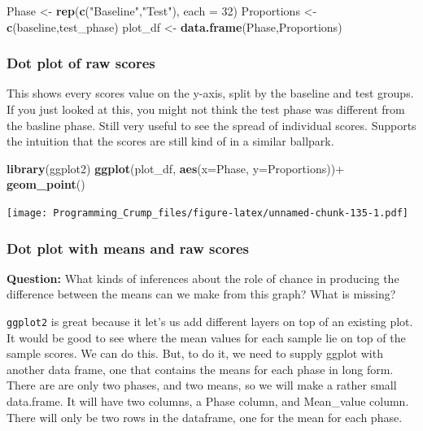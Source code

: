 \documentclass[]{book}
\newenvironment{Shaded}{\begin{snugshade}}{\end{snugshade}}
\newcommand{\KeywordTok}[1]{\textcolor[rgb]{0.13,0.29,0.53}{\textbf{{#1}}}}
\newcommand{\DataTypeTok}[1]{\textcolor[rgb]{0.13,0.29,0.53}{{#1}}}
\newcommand{\DecValTok}[1]{\textcolor[rgb]{0.00,0.00,0.81}{{#1}}}
\newcommand{\StringTok}[1]{\textcolor[rgb]{0.31,0.60,0.02}{{#1}}}
\newcommand{\NormalTok}[1]{{#1}}
\theoremstyle{definition}
\theoremstyle{definition}
\theoremstyle{definition}
\theoremstyle{remark}
\begin{document}
\begin{Shaded}
\begin{Highlighting}[]
\NormalTok{Phase <-}\StringTok{ }\KeywordTok{rep}\NormalTok{(}\KeywordTok{c}\NormalTok{(}\StringTok{"Baseline"}\NormalTok{,}\StringTok{"Test"}\NormalTok{), }\DataTypeTok{each =} \DecValTok{32}\NormalTok{)}
\NormalTok{Proportions <-}\StringTok{ }\KeywordTok{c}\NormalTok{(baseline,test_phase)}
\NormalTok{plot_df <-}\StringTok{ }\KeywordTok{data.frame}\NormalTok{(Phase,Proportions)}
\end{Highlighting}
\end{Shaded}

\subsubsection{Dot plot of raw scores}\label{dot-plot-of-raw-scores}

This shows every scores value on the y-axis, split by the baseline and
test groups. If you just looked at this, you might not think the test
phase was different from the basline phase. Still very useful to see the
spread of individual scores. Supports the intuition that the scores are
still kind of in a similar ballpark.

\begin{Shaded}
\begin{Highlighting}[]
\KeywordTok{library}\NormalTok{(ggplot2)}
\KeywordTok{ggplot}\NormalTok{(plot_df, }\KeywordTok{aes}\NormalTok{(}\DataTypeTok{x=}\NormalTok{Phase, }\DataTypeTok{y=}\NormalTok{Proportions))+}
\StringTok{  }\KeywordTok{geom_point}\NormalTok{()}
\end{Highlighting}
\end{Shaded}

\texttt{[image: Programming\_Crump\_files/figure-latex/unnamed-chunk-135-1.pdf]}

\subsubsection{Dot plot with means and raw
scores}\label{dot-plot-with-means-and-raw-scores}

\textbf{Question:} What kinds of inferences about the role of chance in
producing the difference between the means can we make from this graph?
What is missing?

\texttt{ggplot2} is great because it let's us add different layers on
top of an existing plot. It would be good to see where the mean values
for each sample lie on top of the sample scores. We can do this. But, to
do it, we need to supply ggplot with another data frame, one that
contains the means for each phase in long form. There are are only two
phases, and two means, so we will make a rather small data.frame. It
will have two columns, a Phase column, and Mean\_value column. There
will only be two rows in the dataframe, one for the mean for each phase.
\end{document}
